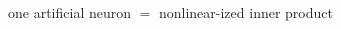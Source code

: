 \documentclass[xcolor={svgnames},
               hyperref={colorlinks,citecolor=DeepPink4,linkcolor=FireBrick,urlcolor=Maroon}]
               {beamer}
\begin{document}
\begin{frame}{one artificial neuron $=$ nonlinear-ized inner product}
\begin{columns}
\begin{column}{0.45\textwidth}
\end{column}
\end{columns}
\end{frame}
\end{document}
